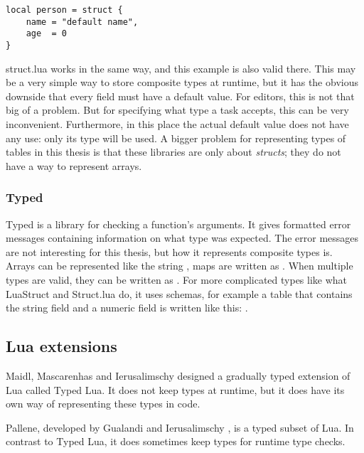 \medskip
\begin{verbatim}
local person = struct {
    name = "default name",
    age  = 0
}
\end{verbatim}

struct.lua works in the same way, and this example is also valid there. This may be a very simple way to store composite types at runtime, but it has the obvious downside that every field must have a default value. For editors, this is not that big of a problem. But for specifying what type a task accepts, this can be very inconvenient. Furthermore, in this place the actual default value does not have any use: only its type will be used. A bigger problem for representing types of tables in this thesis is that these libraries are only about \textit{structs}; they do not have a way to represent arrays.

\subsubsection{Typed}
Typed is a library for checking a function's arguments. It gives formatted error messages containing information on what type was expected. The error messages are not interesting for this thesis, but how it represents composite types is. Arrays can be represented like the string , maps are written as . When multiple types are valid, they can be written as . For more complicated types like what LuaStruct and Struct.lua do, it uses schemas, for example a table that contains the string field  and a numeric field  is written like this: .

\subsection{Lua extensions}
Maidl, Mascarenhas and Ierusalimschy \cite{maidl2014typed} designed a gradually typed extension of Lua called Typed Lua. It does not keep types at runtime, but it does have its own way of representing these types in code.

Pallene, developed by Gualandi and Ierusalimschy \cite{gualandi2020pallene}, is a typed subset of Lua. In contrast to Typed Lua, it does sometimes keep types for runtime type checks.

